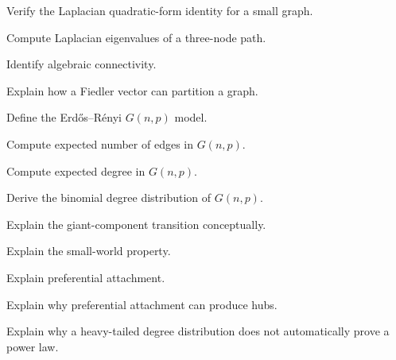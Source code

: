 \begin{exercise}[3]
Verify the Laplacian quadratic-form identity for a small graph.
\end{exercise}

\begin{exercise}[3]
Compute Laplacian eigenvalues of a three-node path.
\end{exercise}

\begin{exercise}[3]
Identify algebraic connectivity.
\end{exercise}

\begin{exercise}[3]
Explain how a Fiedler vector can partition a graph.
\end{exercise}

\begin{exercise}[2]
Define the Erdős--Rényi \(G(n,p)\) model.
\end{exercise}

\begin{exercise}[2]
Compute expected number of edges in \(G(n,p)\).
\end{exercise}

\begin{exercise}[2]
Compute expected degree in \(G(n,p)\).
\end{exercise}

\begin{exercise}[3]
Derive the binomial degree distribution of \(G(n,p)\).
\end{exercise}

\begin{exercise}[3]
Explain the giant-component transition conceptually.
\end{exercise}

\begin{exercise}[2]
Explain the small-world property.
\end{exercise}

\begin{exercise}[2]
Explain preferential attachment.
\end{exercise}

\begin{exercise}[3]
Explain why preferential attachment can produce hubs.
\end{exercise}

\begin{exercise}[3]
Explain why a heavy-tailed degree distribution does not automatically prove
a power law.
\end{exercise}

